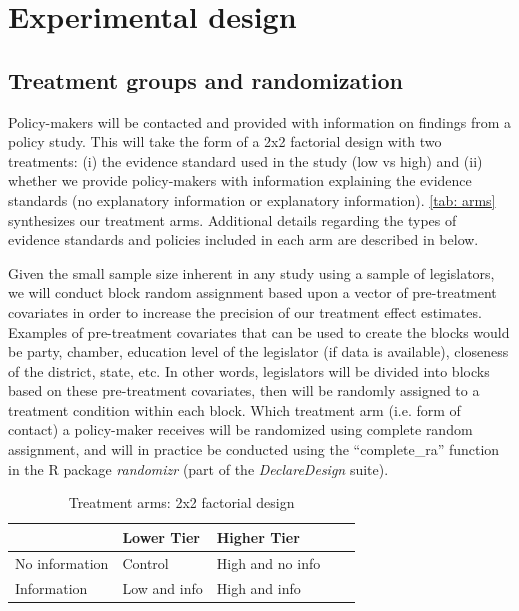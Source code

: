 \documentclass[12pt,final,fleqn]{article}
\theoremstyle{plain}
\begin{document}
\section{Experimental design} \label{sec:Design}

\subsection{Treatment groups and randomization} \label{sec:Treatment}

Policy-makers will be contacted and provided with information on findings from a policy study. This will take the form of a 2x2 factorial design with two treatments: (i) the evidence standard used in the study (low vs high) and (ii) whether we provide policy-makers with information explaining the evidence standards (no explanatory information or explanatory information). \autoref{tab: arms} synthesizes our treatment arms. Additional details regarding the types of evidence standards and policies included in each arm are described in  below. 

Given the small sample size inherent in any study using a sample of legislators, we will conduct block random assignment based upon a vector of pre-treatment covariates in order to increase the precision of our treatment effect estimates. Examples of pre-treatment covariates that can be used to create the blocks would be party, chamber, education level of the legislator (if data is available), closeness of the district, state, etc. In other words, legislators will be divided into blocks based on these pre-treatment covariates, then will be randomly assigned to a treatment condition within each block. Which treatment arm (i.e. form of contact) a policy-maker receives will be randomized using complete random assignment, and will in practice be conducted using the ``complete\_ra'' function in the R package \textit{randomizr} (part of the \textit{DeclareDesign} suite).

\begin{table}[H]
\centering
\caption{Treatment arms: 2x2 factorial design}
\label{tab: arms} 
\bigbreak
\begin{tabular}{|l|l|l|l|l|}
\hline
&Lower Tier & Higher Tier           \\ \hline
No information & Control    &  High and no info           \\ \hline
Information    & Low and info       &  High and info              \\ \hline
\end{tabular}
\end{table}
\end{document}
